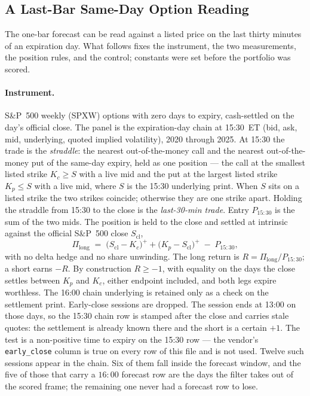 \subsection{A Last-Bar Same-Day Option Reading}
\label{sec:close_option_methods}

The one-bar forecast can be read against a listed price on the last
thirty minutes of an expiration day. What follows fixes the instrument,
the two measurements, the position rules, and the
control; constants were set before the portfolio was scored.

\paragraph{Instrument.} S\&P~500 weekly (SPXW) options with zero days
to expiry, cash-settled on the day's official close. The panel is the
expiration-day chain at 15:30~ET (bid, ask, mid, underlying, quoted
implied volatility), 2020 through 2025. At 15:30 the trade is the
\emph{straddle}: the nearest out-of-the-money call and the nearest
out-of-the-money put of the same-day expiry, held as one position --- the
call at the smallest listed strike $K_c \ge S$ with a live mid and the put at
the largest listed strike $K_p \le S$ with a live mid, where $S$ is the 15:30
underlying print. When $S$ sits on a listed strike the two strikes coincide;
otherwise they are one strike apart. Holding the straddle from 15:30 to the
close is the \emph{last-30-min trade}. Entry
$P_{15:30}$ is the sum of the two mids. The position is held to the
close and settled at intrinsic against the official S\&P~500 close
$S_{\mathrm{cl}}$,
\begin{equation}
    \Pi_{\mathrm{long}}
    \;=\;
    \bigl(S_{\mathrm{cl}}-K_c\bigr)^{+}
    + \bigl(K_p-S_{\mathrm{cl}}\bigr)^{+}
    \;-\; P_{15:30},
    \label{eq:close_opt_settle}
\end{equation}
with no delta hedge and no share unwinding. The long return is
$R = \Pi_{\mathrm{long}}/P_{15:30}$; a short earns $-R$. By
construction $R \ge -1$, with equality on the days the close settles
between $K_p$ and $K_c$, either endpoint included, and both legs expire
worthless. The
16:00 chain underlying is retained only as a check on the settlement
print. Early-close sessions are dropped. The session ends at 13:00 on those
days, so the 15:30 chain row is stamped after the close and carries stale
quotes: the settlement is already known there and the short is a certain
$+1$. The test is a non-positive time to expiry on the 15:30 row --- the
vendor's \texttt{early\_close} column is true on every row of this file and
is not used. Twelve such sessions appear in the chain.
Six of them fall inside the forecast window, and the
five of those that carry a $16{:}00$ forecast row are the days
the filter takes out of the scored frame; the remaining one never had a
forecast row to lose.

